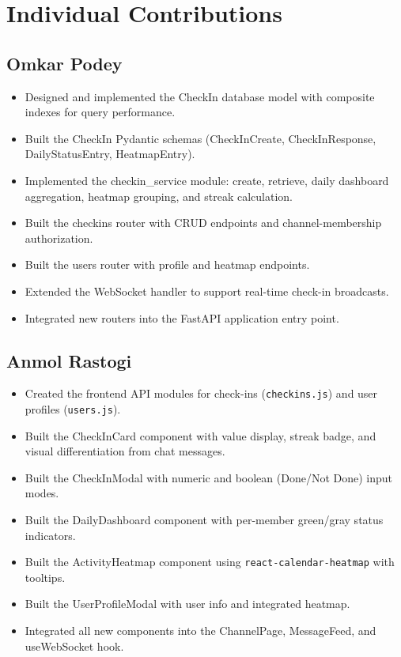 \documentclass[11pt]{article}
\begin{document}
\section{Individual Contributions}

\subsection{Omkar Podey}
\begin{itemize}[leftmargin=1.5em]
    \item Designed and implemented the CheckIn database model with composite indexes for query performance.
    \item Built the CheckIn Pydantic schemas (CheckInCreate, CheckInResponse, DailyStatusEntry, HeatmapEntry).
    \item Implemented the checkin\_service module: create, retrieve, daily dashboard aggregation, heatmap grouping, and streak calculation.
    \item Built the checkins router with CRUD endpoints and channel-membership authorization.
    \item Built the users router with profile and heatmap endpoints.
    \item Extended the WebSocket handler to support real-time check-in broadcasts.
    \item Integrated new routers into the FastAPI application entry point.
\end{itemize}

\subsection{Anmol Rastogi}
\begin{itemize}[leftmargin=1.5em]
    \item Created the frontend API modules for check-ins (\texttt{checkins.js}) and user profiles (\texttt{users.js}).
    \item Built the CheckInCard component with value display, streak badge, and visual differentiation from chat messages.
    \item Built the CheckInModal with numeric and boolean (Done/Not Done) input modes.
    \item Built the DailyDashboard component with per-member green/gray status indicators.
    \item Built the ActivityHeatmap component using \texttt{react-calendar-heatmap} with tooltips.
    \item Built the UserProfileModal with user info and integrated heatmap.
    \item Integrated all new components into the ChannelPage, MessageFeed, and useWebSocket hook.
\end{itemize}
\end{document}
